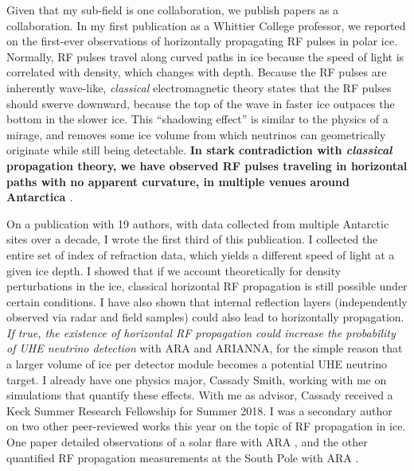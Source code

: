\documentclass[../../main.tex]{subfiles}
\begin{document}
Given that my sub-field is one collaboration, we publish papers as a collaboration.  In my first publication as a Whittier College professor, we reported on the first-ever observations of horizontally propagating RF pulses in polar ice.  Normally, RF pulses travel along curved paths in ice because the speed of light is correlated with density, which changes with depth.  Because the RF pulses are inherently wave-like, \textit{classical} electromagnetic theory states that the RF pulses should swerve downward, because the top of the wave in faster ice outpaces the bottom in the slower ice.  This ``shadowing effect'' is similar to the physics of a mirage, and removes some ice volume from which neutrinos can geometrically originate while still being detectable.  \textbf{In stark contradiction with \textit{classical} propagation theory, we have observed RF pulses traveling in horizontal paths with no apparent curvature, in multiple venues around Antarctica \cite{horizPaper}}.  \\ \hspace{0.1cm}

On a publication with 19 authors, with data collected from multiple Antarctic sites over a decade, I wrote the first third of this publication.  I collected the entire set of index of refraction data, which yields a different speed of light at a given ice depth.  I showed that if we account theoretically for density perturbations in the ice, classical horizontal RF propagation is still possible under certain conditions.  I have also shown that internal reflection layers (independently observed via radar and field samples) could also lead to horizontally propagation.  \textit{If true, the existence of horizontal RF propagation could increase the probability of UHE neutrino detection} with ARA and ARIANNA, for the simple reason that a larger volume of ice per detector module becomes a potential UHE neutrino target.  I already have one physics major, Cassady Smith, working with me on simulations that quantify these effects.  With me as advisor, Cassady received a Keck Summer Research Fellowship for Summer 2018.  I was a secondary author on two other peer-reviewed works this year on the topic of RF propagation in ice.  One paper detailed observations of a solar flare with ARA \cite{flare}, and the other quantified RF propagation measurements at the South Pole with ARA \cite{dielectric}.
\end{document}
